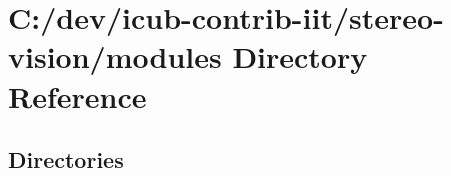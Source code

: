\section{C\+:/dev/icub-\/contrib-\/iit/stereo-\/vision/modules Directory Reference}
\label{dir_e05d7e2b1ecd646af5bb94391405f3b5}
\subsection*{Directories}
\begin{DoxyCompactItemize}
\end{DoxyCompactItemize}
